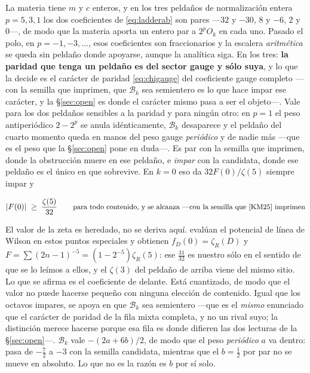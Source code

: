 \documentclass[11pt,a4paper]{article}
\newenvironment{keyeq}
  {\begin{center}\setlength{\fboxsep}{9pt}\setlength{\fboxrule}{0.8pt}%
   \begin{lrbox}{\keyeqbox}\begin{minipage}{0.88\textwidth}}
  {\end{minipage}\end{lrbox}%
   \fcolorbox{hdrblue!55}{hdrblue!6}{\usebox{\keyeqbox}}\end{center}}
\begin{document}
La materia tiene $m$ y $c$ enteros, y en los tres peldaños de normalización entera $p=5,3,1$ los
dos coeficientes de \eqref{eq:ladderab} son pares ---$32$ y $-30$, $8$ y $-6$, $2$ y $0$---, de
modo que la materia aporta un entero par a $2^{p}O_k$ en cada uno. Pasado el polo, en
$p=-1,-3,\dots$, esos coeficientes son fraccionarios y la escalera \emph{aritmética} se queda sin
peldaño donde apoyarse, aunque la analítica siga. En los tres:
\textbf{la paridad que tenga un peldaño es del sector gauge y sólo suya},
y lo que la decide es el carácter de paridad \eqref{eq:chigauge} del coeficiente gauge completo
---con la semilla que \cite{KM25} imprimen, que $\mathcal{B}_k$ sea semientero es lo que hace impar
ese carácter, y la \S\ref{sec:open} es donde el carácter mismo pasa a ser el objeto---. Vale para
los dos peldaños sensibles a la paridad y para ningún otro: en $p=1$ el peso antiperiódico $2-2^{p}$
se anula idénticamente, $\mathcal{B}_k$ desaparece y el peldaño del cuarto momento queda en manos del
peso gauge \emph{periódico} y de nadie más ---que es el peso que la \S\ref{sec:open} pone en duda---.
Es par con la semilla que \cite{KM25} imprimen, donde la obstrucción muere en ese peldaño, e
\emph{impar} con la candidata, donde ese peldaño es el único en que sobrevive. En $k=0$ eso da $32F(0)/\zeta(5)$ siempre impar y
\begin{keyeq}
\begin{equation}\label{eq:valuebound}
  |F(0)|\;\ge\;\frac{\zeta(5)}{32}\qquad
  \text{\small para todo contenido, y se alcanza ---con la semilla que \cite{KM25} imprimen}
\end{equation}
\end{keyeq}
El valor de la zeta es heredado, no se deriva aquí. \cite{HHHK03} evalúan el potencial de línea de
Wilson en estos puntos especiales y obtienen $f_D(0)=\zeta_R(D)$ y
$F=\sum(2n-1)^{-5}=(1-2^{-5})\zeta_R(5)$: ese $\tfrac{31}{32}$ es nuestro sólo en el sentido de que
se lo leímos a ellos, y el $\zeta(3)$ del peldaño de arriba viene del mismo sitio. Lo que se afirma
es el coeficiente de delante. Está cuantizado, de modo que el valor no puede hacerse pequeño con
ninguna elección de contenido. Igual que los octavos impares,
se apoya en que $\mathcal{B}_k$ sea semientero ---que es el \emph{mismo} enunciado que el carácter
de paridad de la fila mixta completa, y no un rival suyo; la distinción merece hacerse porque esa
fila es donde difieren las dos lecturas de la \S\ref{sec:open}---. $\mathcal{B}_k$ vale
$-(2a+6b)/2$, de modo que el peso \emph{periódico} $a$ va dentro: pasa de $-\tfrac72$ a $-3$ con la
semilla candidata, mientras que el $b=\tfrac12$ por par no se mueve en absoluto. Lo que no es la
razón es $b$ por sí solo.
\end{document}
